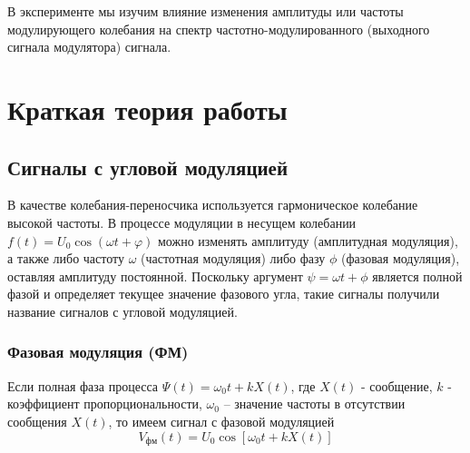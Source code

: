 В эксперименте мы изучим влияние изменения амплитуды или частоты модулирующего колебания на спектр частотно-модулированного (выходного сигнала модулятора) сигнала. 

\section{Краткая теория работы}
\subsection{Сигналы с угловой модуляцией}
В качестве колебания-переносчика используется гармоническое колебание высокой частоты. В процессе модуляции в несущем колебании $f(t)=U_{0} \cos (\omega t+\varphi)$ можно изменять амплитуду (амплитудная модуляция), а также либо частоту $\omega$ (частотная модуляция) либо фазу $\phi$ (фазовая модуляция), оставляя амплитуду постоянной. Поскольку аргумент $\psi=\omega t+\phi$ является полной фазой и определяет текущее значение фазового угла, такие сигналы получили название сигналов с угловой модуляцией.

\subsubsection{Фазовая модуляция (ФМ)}

Если полная фаза процесса $\Psi(t)=\omega_{0} t+k X(t)$, где $X(t)$ - сообщение, $k$ -
коэффициент	пропорциональности,	$\omega_0$ --
значение частоты в отсутствии сообщения $X(t)$, то имеем сигнал с фазовой модуляцией
\begin{equation}
	V_\text{фм}(t)=U_{0} \cos \left[\omega_{0} t+k X(t)\right]
\end{equation}
	


